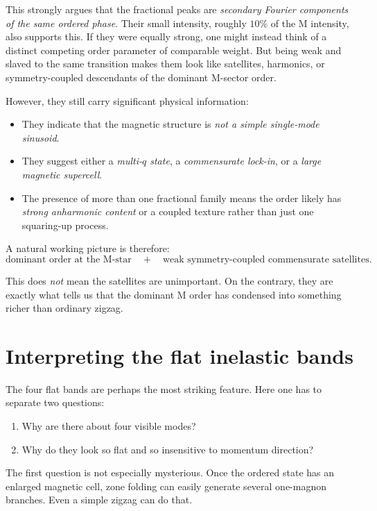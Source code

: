 \documentclass[11pt]{article}
\begin{document}
This strongly argues that the fractional peaks are \emph{secondary Fourier components of the same ordered phase}. Their small intensity, roughly \(10\%\) of the M intensity, also supports this. If they were equally strong, one might instead think of a distinct competing order parameter of comparable weight. But being weak and slaved to the same transition makes them look like satellites, harmonics, or symmetry-coupled descendants of the dominant M-sector order.

However, they still carry significant physical information:
\begin{itemize}[leftmargin=2em,itemsep=0.35em]
    \item They indicate that the magnetic structure is \emph{not a simple single-mode sinusoid}.
    \item They suggest either a \emph{multi-$q$ state}, a \emph{commensurate lock-in}, or a \emph{large magnetic supercell}.
    \item The presence of more than one fractional family means the order likely has \emph{strong anharmonic content} or a coupled texture rather than just one squaring-up process.
\end{itemize}

A natural working picture is therefore:
\begin{equation}
\text{dominant order at the M-star} \quad + \quad \text{weak symmetry-coupled commensurate satellites}.
\end{equation}

This does \emph{not} mean the satellites are unimportant. On the contrary, they are exactly what tells us that the dominant M order has condensed into something richer than ordinary zigzag.

\section{Interpreting the flat inelastic bands}

The four flat bands are perhaps the most striking feature. Here one has to separate two questions:

\begin{enumerate}[leftmargin=2em,itemsep=0.35em]
    \item Why are there about four visible modes?
    \item Why do they look so flat and so insensitive to momentum direction?
\end{enumerate}

The first question is not especially mysterious. Once the ordered state has an enlarged magnetic cell, zone folding can easily generate several one-magnon branches. Even a simple zigzag can do that.
\end{document}
